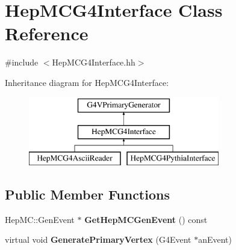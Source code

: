 \hypertarget{class_hep_m_c_g4_interface}{}\section{Hep\+M\+C\+G4\+Interface Class Reference}
\label{class_hep_m_c_g4_interface}


{\ttfamily \#include $<$Hep\+M\+C\+G4\+Interface.\+hh$>$}

Inheritance diagram for Hep\+M\+C\+G4\+Interface\+:\begin{figure}[H]
\begin{center}
\leavevmode
\includegraphics[height=3.000000cm]{class_hep_m_c_g4_interface}
\end{center}
\end{figure}
\subsection*{Public Member Functions}
\begin{DoxyCompactItemize}
\item 
\hypertarget{class_hep_m_c_g4_interface_a0e9f3cae6c2d9ef27619a6db8af39c58}{}Hep\+M\+C\+::\+Gen\+Event $\ast$ {\bfseries Get\+Hep\+M\+C\+Gen\+Event} () const \label{class_hep_m_c_g4_interface_a0e9f3cae6c2d9ef27619a6db8af39c58}

\item 
\hypertarget{class_hep_m_c_g4_interface_a2947defb50b862d5fe962ebd35b35b3b}{}virtual void {\bfseries Generate\+Primary\+Vertex} (G4\+Event $\ast$an\+Event)\label{class_hep_m_c_g4_interface_a2947defb50b862d5fe962ebd35b35b3b}

\end{DoxyCompactItemize}

